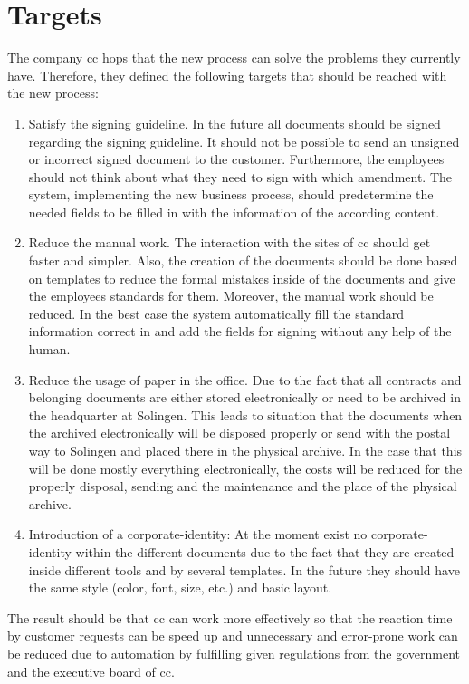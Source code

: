 \section{Targets}
The company \gls{cc} hops that the new process can solve the problems they currently have. Therefore, they defined the following targets that should be reached with the new process:
\begin{enumerate}
	\item Satisfy the signing guideline. \newline
	In the future all documents should be signed regarding the signing guideline. It should not be possible to send an unsigned or incorrect signed document to the customer. Furthermore, the employees should not think about what they need to sign with which amendment. The system, implementing the new business process, should predetermine the needed fields to be filled in with the information of the according content.
	\item Reduce the manual work. \newline
	The interaction with the sites of \gls{cc} should get faster and simpler. Also, the creation of the documents should be done based on templates to reduce the formal mistakes inside of the documents and give the employees standards for them. Moreover, the manual work should be reduced. In the best case the system automatically fill the standard information correct in and add the fields for signing without any help of the human.  
	\item Reduce the usage of paper in the office. \newline
	Due to the fact that all contracts and belonging documents are either stored electronically or need to be archived in the headquarter at Solingen. This leads to situation that the documents when the archived electronically will be disposed properly or send with the postal way to Solingen and placed there in the physical archive. In the case that this will be done mostly everything electronically, the costs will be reduced for the properly disposal, sending and the maintenance and the place of the physical archive. 
	\item Introduction of a corporate-identity: \newline
	At the moment exist no corporate-identity within the different documents due to the fact that they are created inside different tools and by several templates. In the future they should have the same style (color, font, size, etc.) and basic layout.
\end{enumerate}
The result should be that \gls{cc} can work more effectively so that the reaction time by customer requests can be speed up and unnecessary and error-prone work can be reduced due to automation by fulfilling given regulations from the government and the executive board of \gls{cc}.

